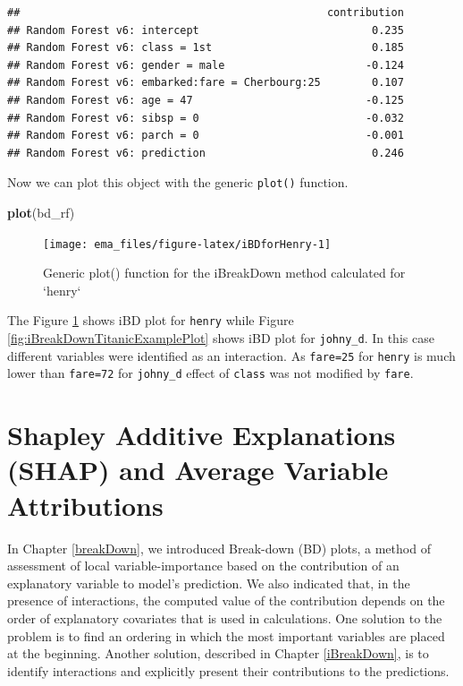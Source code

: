 \documentclass[12pt,]{krantz}
\newenvironment{Shaded}{\begin{snugshade}}{\end{snugshade}}
\newcommand{\KeywordTok}[1]{\textcolor[rgb]{0.13,0.29,0.53}{\textbf{#1}}}
\newcommand{\NormalTok}[1]{#1}
\begin{document}
\begin{verbatim}
##                                                contribution
## Random Forest v6: intercept                           0.235
## Random Forest v6: class = 1st                         0.185
## Random Forest v6: gender = male                      -0.124
## Random Forest v6: embarked:fare = Cherbourg:25        0.107
## Random Forest v6: age = 47                           -0.125
## Random Forest v6: sibsp = 0                          -0.032
## Random Forest v6: parch = 0                          -0.001
## Random Forest v6: prediction                          0.246
\end{verbatim}

Now we can plot this object with the generic \texttt{plot()} function.

\begin{Shaded}
\begin{Highlighting}[]
\KeywordTok{plot}\NormalTok{(bd_rf) }
\end{Highlighting}
\end{Shaded}

\begin{figure}

{\centering \texttt{[image: ema\_files/figure-latex/iBDforHenry-1]} 

}

\caption{Generic plot() function for the iBreakDown method calculated for `henry`}\label{fig:iBDforHenry}
\end{figure}

The Figure \ref{fig:iBDforHenry} shows iBD plot for \texttt{henry} while Figure \ref{fig:iBreakDownTitanicExamplePlot} shows iBD plot for \texttt{johny\_d}. In this case different variables were identified as an interaction. As \texttt{fare=25} for \texttt{henry} is much lower than \texttt{fare=72} for \texttt{johny\_d} effect of \texttt{class} was not modified by \texttt{fare}.

\hypertarget{shapley}{%
\section{Shapley Additive Explanations (SHAP) and Average Variable Attributions}\label{shapley}}

In Chapter \ref{breakDown}, we introduced Break-down (BD) plots, a method of assessment of local variable-importance based on the contribution of an explanatory variable to model's prediction. We also indicated that, in the presence of interactions, the computed value of the contribution depends on the order of explanatory covariates that is used in calculations. One solution to the problem is to find an ordering in which the most important variables are placed at the beginning. Another solution, described in Chapter \ref{iBreakDown}, is to identify interactions and explicitly present their contributions to the predictions.
\end{document}
